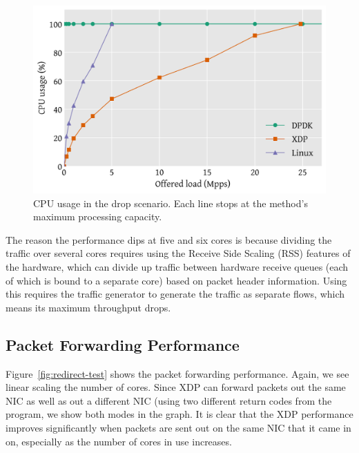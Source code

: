 \documentclass[10pt,sigconf]{acmart}
\begin{document}
\begin{figure}[t]
\centering
\includegraphics[width=\linewidth]{figures/drop-cpu.pdf}
\caption{\label{fig:drop-cpu} CPU usage in the drop scenario. Each line stops at
the method's maximum processing capacity.}
\end{figure}


The reason the performance dips at five and six cores is because dividing the
traffic over several cores requires using the Receive Side Scaling (RSS)
features of the hardware, which can divide up traffic between hardware receive
queues (each of which is bound to a separate core) based on packet header
information. Using this requires the traffic generator to generate the traffic
as separate flows, which means its maximum throughput drops.

\subsection{Packet Forwarding Performance}
\label{sec:pack-forw-perf}
Figure~\ref{fig:redirect-test} shows the packet forwarding performance. Again,
we see linear scaling the number of cores. Since XDP can forward packets out the
same NIC as well as out a different NIC (using two different return codes from
the program, we show both modes in the graph. It is clear that the XDP
performance improves significantly when packets are sent out on the same NIC
that it came in on, especially as the number of cores in use increases.
\end{document}

